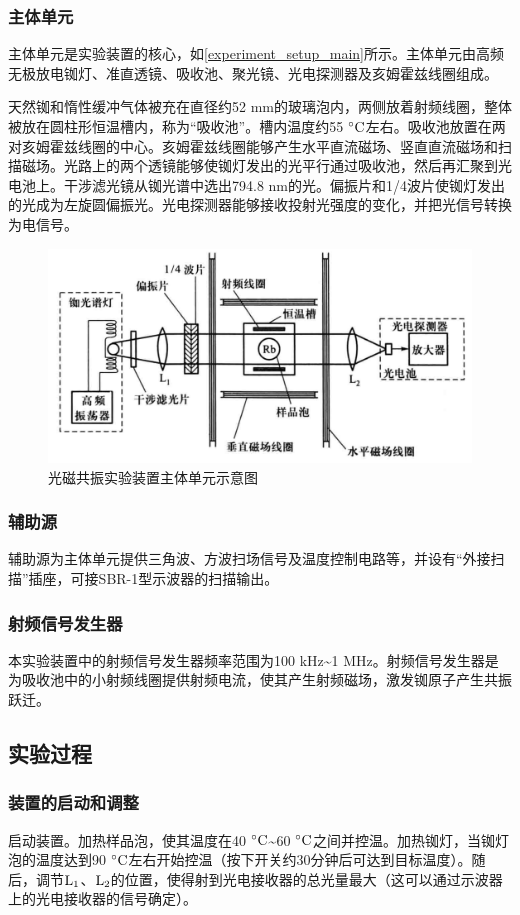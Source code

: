 \documentclass[font=default]{mpltx}
\begin{document}
\subsubsection{主体单元}
主体单元是实验装置的核心，如\autoref{experiment_setup_main}所示。主体单元由高频无极放电铷灯、准直透镜、吸收池、聚光镜、光电探测器及亥姆霍兹线圈组成。

天然铷和惰性缓冲气体被充在直径约52 mm的玻璃泡内，两侧放着射频线圈，整体被放在圆柱形恒温槽内，称为“吸收池”。槽内温度约55 ${\rm ^\circ C}$左右。吸收池放置在两对亥姆霍兹线圈的中心。亥姆霍兹线圈能够产生水平直流磁场、竖直直流磁场和扫描磁场。光路上的两个透镜能够使铷灯发出的光平行通过吸收池，然后再汇聚到光电池上。干涉滤光镜从铷光谱中选出794.8 nm的光。偏振片和1/4波片使铷灯发出的光成为左旋圆偏振光。光电探测器能够接收投射光强度的变化，并把光信号转换为电信号。
\begin{figure}
  \centering
  \includegraphics[width=0.7\linewidth]{fig/experiment_setup_main.png}
  \caption{光磁共振实验装置主体单元示意图}
  \label{experiment_setup_main}
\end{figure}
\subsubsection{辅助源}
辅助源为主体单元提供三角波、方波扫场信号及温度控制电路等，并设有“外接扫描”插座，可接SBR-1型示波器的扫描输出。
\subsubsection{射频信号发生器}
本实验装置中的射频信号发生器频率范围为100 kHz\textasciitilde1 MHz。射频信号发生器是为吸收池中的小射频线圈提供射频电流，使其产生射频磁场，激发铷原子产生共振跃迁。
\subsection{实验过程}
\subsubsection{装置的启动和调整}
启动装置。加热样品泡，使其温度在40 ${\rm ^\circ C}$\textasciitilde60 ${\rm ^\circ C}$之间并控温。加热铷灯，当铷灯泡的温度达到90 ${\rm ^\circ C}$左右开始控温（按下开关约30分钟后可达到目标温度）。随后，调节${\rm L_1}$、${\rm L_2}$的位置，使得射到光电接收器的总光量最大（这可以通过示波器上的光电接收器的信号确定）。
\end{document}
